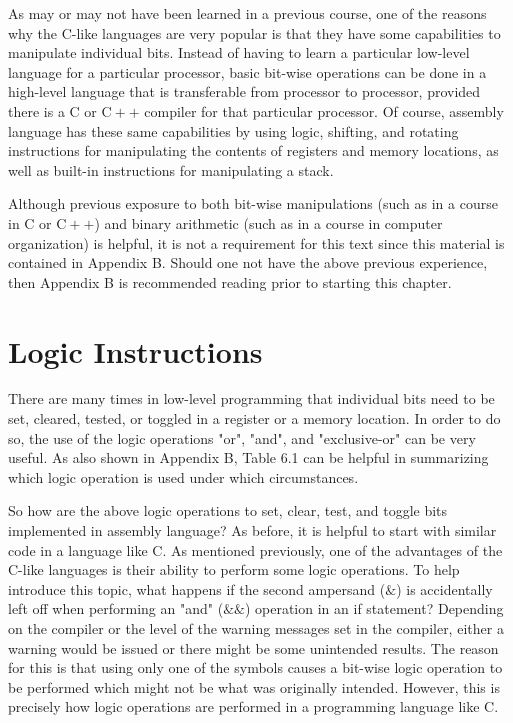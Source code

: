 \documentclass[10pt]{book}
\begin{document}
As may or may not have been learned in a previous course, one of the reasons why the C-like languages are very popular is that they have some capabilities to manipulate individual bits. Instead of having to learn a particular low-level language for a particular processor, basic bit-wise operations can be done in a high-level language that is transferable from processor to processor, provided there is a C or $\mathrm{C}++$ compiler for that particular processor. Of course, assembly language has these same capabilities by using logic, shifting, and rotating instructions for manipulating the contents of registers and memory locations, as well as built-in instructions for manipulating a stack.

Although previous exposure to both bit-wise manipulations (such as in a course in C or $\mathrm{C}++$) and binary arithmetic (such as in a course in computer organization) is helpful, it is not a requirement for this text since this material is contained in Appendix B. Should one not have the above previous experience, then Appendix B is recommended reading prior to starting this chapter.

\section{Logic Instructions}
There are many times in low-level programming that individual bits need to be set, cleared, tested, or toggled in a register or a memory location. In order to do so, the use of the logic operations "or", "and", and "exclusive-or" can be very useful. As also shown in Appendix B, Table 6.1 can be helpful in summarizing which logic operation is used under which circumstances.

So how are the above logic operations to set, clear, test, and toggle bits implemented in assembly language? As before, it is helpful to start with similar code in a language like C. As mentioned previously, one of the advantages of the C-like languages is their ability to perform some logic operations. To help introduce this topic, what happens if the second ampersand ($\&$) is accidentally left off when performing an "and" ($\&\&$) operation in an if statement? Depending on the compiler or the level of the warning messages set in the compiler, either a warning would be issued or there might be some unintended results. The reason for this is that using only one of the symbols causes a bit-wise logic operation to be performed which might not be what was originally intended. However, this is precisely how logic operations are performed in a programming language like C.
\end{document}
